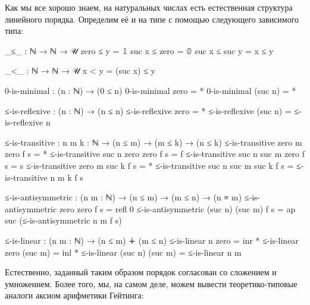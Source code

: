 \documentclass{article}[12pt]
\begin{document}
Как мы все хорошо знаем, на натуральных числах есть естественная структура линейного порядка. Определим
её и на типе  с помощью следующего зависимого типа:
\begin{code}
_≤_ : ℕ → ℕ → 𝒰
zero ≤ y = 𝟙
suc x ≤ zero = 𝟘
suc x ≤ suc y = x ≤ y

_<_ : ℕ → ℕ → 𝒰
x < y = (suc x) ≤ y

0-is-minimal : (n : ℕ) → (0 ≤ n)
0-is-minimal zero = *
0-is-minimal (suc n) = *

≤-is-reflexive : (n : ℕ) → (n ≤ n)
≤-is-reflexive zero = *
≤-is-reflexive (suc n) = ≤-is-reflexive n

≤-is-transitive : {n m k : ℕ} → (n ≤ m) → (m ≤ k) → (n ≤ k)
≤-is-transitive {zero} {m} {zero} f s = *
≤-is-transitive {suc n} {zero} {zero} f s = f
≤-is-transitive {suc n} {suc m} {zero} f s = s
≤-is-transitive {zero} {m} {suc k} f s = *
≤-is-transitive {suc n} {suc m} {suc k} f s = ≤-is-transitive {n} {m} {k} f s

≤-is-antisymmetric : (n m : ℕ) → (n ≤ m) → (m ≤ n) → (n ≡ m)
≤-is-antisymmetric zero zero f s = refl 0
≤-is-antisymmetric (suc n) (suc m) f s = ap suc (≤-is-antisymmetric n m f s)

≤-is-linear : (n m : ℕ) → (n ≤ m) ∔ (m ≤ n)
≤-is-linear n zero = inr *
≤-is-linear zero (suc m) = inl *
≤-is-linear (suc n) (suc m) = ≤-is-linear n m
\end{code}
Естественно, заданный таким образом порядок согласован со сложением и умножением. Более того,
мы, на самом деле, можем вывести теоретико-типовые аналоги аксиом арифметики Гейтинга:
\end{document}
